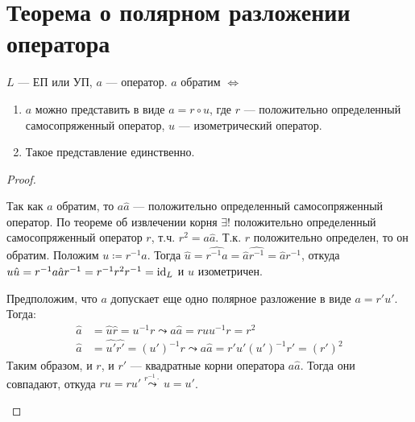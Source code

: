 \section{Теорема о полярном разложении оператора}

\begin{thm*}
    $L$ --- ЕП или УП, $a$ --- оператор. $a$ обратим $\Leftrightarrow$
    \begin{enumerate}
        \item $a$ можно представить в виде $a = r \circ u$, где $r$ --- положительно определенный самосопряженный оператор, $u$ --- изометрический оператор.
        \item Такое представление единственно.
    \end{enumerate}
\end{thm*}

\begin{proof}
    \begin{proofpart}
        Так как $a$ обратим, то $a \hat{a}$ --- положительно определенный самосопряженный оператор. По теореме об извлечении корня $\exists!$ положительно определенный самосопряженный оператор $r$, т.ч. $r^2 = a \hat{a}$. Т.к. $r$ положительно определен, то он обратим. Положим $u \coloneqq r^{-1} a$. Тогда $\hat{u} = \widehat{r^{-1} a} = \hat{a} \widehat{r^{-1}} = \hat{a} r^{-1}$, откуда $u\hat{u} = r^{-1} a\hat{a} r^{-1} = r^{-1} r^2 r^{-1} = \operatorname{id}_L$ и $u$ изометричен.
    \end{proofpart}

    \begin{proofpart}
        Предположим, что $a$ допускает еще одно полярное разложение в виде $a = r'u'$. Тогда:
        \begin{align*}
            \hat{a} &= \hat{u}\hat{r} = u^{-1} r \leadsto a\hat{a} = ru u^{-1} r = r^2 \\
            \hat{a} &= \hat{u'}\hat{r'} = (u')^{-1} r \leadsto a\hat{a} = r'u' (u')^{-1} r' = (r')^2
        \end{align*}
        Таким образом, и $r$, и $r'$ --- квадратные корни оператора $a\hat{a}$. Тогда они совпадают, откуда $ru = ru' \stackrel{r^{-1} \cdot}{\leadsto} u = u'$.
    \end{proofpart}
\end{proof}